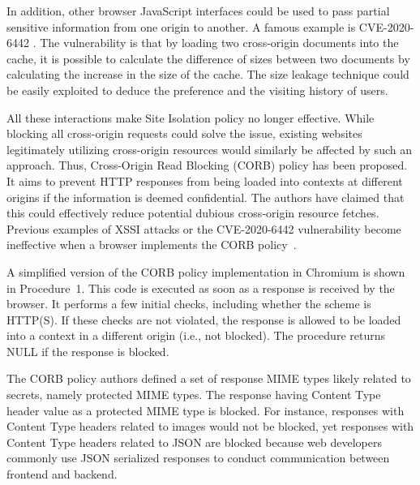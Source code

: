 \documentclass[10pt,conference]{IEEEtran}
\begin{document}

In addition, other browser JavaScript interfaces could be used to pass partial sensitive information from one origin to another. A famous example is CVE-2020-6442 \cite{noauthor_cve_nodate}. The vulnerability is that by loading two cross-origin documents into the cache, it is possible to calculate the difference of sizes between two documents by calculating the increase in the size of the cache. The size leakage technique could be easily exploited to deduce the preference and the visiting history of users. 

All these interactions make Site Isolation policy no longer effective. While blocking all cross-origin requests could solve the issue, existing websites legitimately utilizing cross-origin resources would similarly be affected by such an approach. Thus, Cross-Origin Read Blocking (CORB) policy has been proposed. It aims to prevent HTTP responses from being loaded into contexts at different origins if the information is deemed confidential. The authors have claimed that this could effectively reduce potential dubious cross-origin resource fetches. Previous examples of XSSI attacks or the CVE-2020-6442 vulnerability become ineffective when a browser implements the CORB policy~\cite{noauthor_1013906_nodate}. 

A simplified version of the CORB policy implementation in Chromium is shown in Procedure~1. This code is executed as soon as a response is received by the browser. It performs a few initial checks, including whether the scheme is HTTP(S). If these checks are not violated, the response is allowed to be loaded into a context in a different origin (i.e., not blocked). The procedure returns NULL if the response is blocked. 

The CORB policy authors defined a set of response MIME types likely related to secrets, namely protected MIME types. The response having Content Type header value as a protected MIME type is blocked. For instance, responses with Content Type headers related to images would not be blocked, yet responses with Content Type headers related to JSON are blocked because web developers commonly use JSON serialized responses to conduct communication between frontend and backend. 
\end{document}
